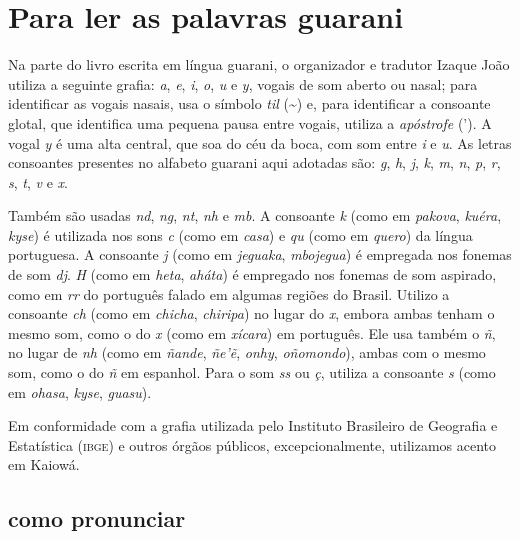 \chapter{Para ler as palavras guarani}


Na parte do livro escrita em língua guarani, o organizador e tradutor Izaque João utiliza a seguinte grafia: \textit{a}, \textit{e}, \textit{i}, \textit{o}, \textit{u} e \textit{y}, vogais de som aberto ou nasal; para identificar as vogais nasais, usa o símbolo \textit{til} (\textasciitilde{}) e, para identificar a consoante
glotal, que identifica uma pequena pausa entre vogais, utiliza a
\textit{apóstrofe} ('). A vogal \textit{y} é uma alta central, que soa do céu da boca, com
som entre \textit{i} e \textit{u}. As letras consoantes presentes no alfabeto guarani aqui
adotadas são: \textit{g}, \textit{h}, \textit{j}, \textit{k}, \textit{m}, \textit{n}, \textit{p}, \textit{r}, \textit{s}, \textit{t}, \textit{v} e \textit{x}.

Também são usadas \textit{nd}, \textit{ng}, \textit{nt}, \textit{nh} e \textit{mb}. A consoante \textit{k} (como em \textit{pakova}, \textit{kuéra}, \textit{kyse}) é utilizada nos sons \textit{c} (como em \textit{casa}) e \textit{qu} (como em \textit{quero}) da língua portuguesa. A consoante \textit{j} (como em \textit{jeguaka}, \textit{mbojegua}) é empregada nos fonemas de som \textit{dj}. \textit{H} (como em \textit{heta}, \textit{aháta}) é empregado nos
fonemas de som aspirado, como em \textit{rr} do português falado em algumas
regiões do Brasil. Utilizo a consoante \textit{ch} (como em \textit{chicha},
\textit{chiripa}) no lugar do \textit{x}, embora ambas tenham o mesmo som, como o
do \textit{x} (como em \textit{xícara}) em português. Ele usa também o \textit{ñ}, no lugar de \textit{nh} (como em \textit{ñande}, \textit{ñe'ẽ}, \textit{onhy}, \textit{oñomondo}), ambas com o mesmo som, como o do \textit{ñ} em espanhol. Para o som \textit{ss} ou \textit{ç}, utiliza a consoante \textit{s} (como em \textit{ohasa}, \textit{kyse}, \textit{guasu}).

Em conformidade com a grafia utilizada pelo Instituto Brasileiro de Geografia e Estatística (\textsc{ibge}) e outros órgãos públicos, excepcionalmente, utilizamos acento em Kaiowá.

\section{como pronunciar}

